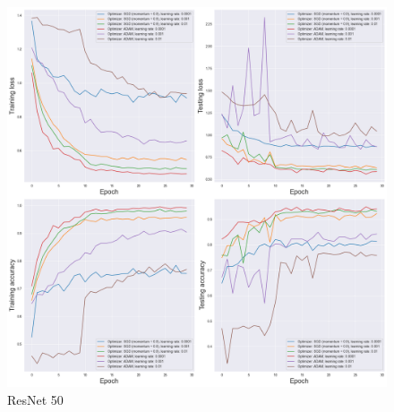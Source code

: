 \begin{figure}[!ht]
    \centering
    \includegraphics[width=\textwidth]{figures/gridsearches/resnet50}
    \caption{ResNet 50}
    \label{fig:resnet50GridSearch}
\end{figure}


